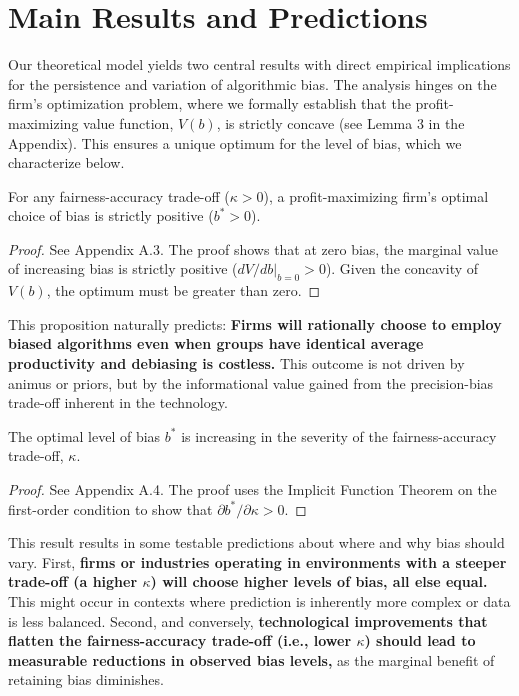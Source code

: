 \section{Main Results and Predictions}

Our theoretical model yields two central results with direct empirical implications for the persistence and variation of algorithmic bias. The analysis hinges on the firm's optimization problem, where we formally establish that the profit-maximizing value function, $V(b)$, is strictly concave (see Lemma 3 in the Appendix). This ensures a unique optimum for the level of bias, which we characterize below.

\begin{proposition}
\label{prop:existence}
For any fairness-accuracy trade-off ($\kappa > 0$), a profit-maximizing firm's optimal choice of bias is strictly positive ($b^* > 0$).
\end{proposition}
\begin{proof}
See Appendix A.3. The proof shows that at zero bias, the marginal value of increasing bias is strictly positive ($dV/db|_{b=0} > 0$). Given the concavity of $V(b)$, the optimum must be greater than zero.
\end{proof}

This proposition naturally predicts: \textbf{Firms will rationally choose to employ biased algorithms even when groups have identical average productivity and debiasing is costless.} This outcome is not driven by animus or priors, but by the informational value gained from the precision-bias trade-off inherent in the technology.

\begin{proposition}
\label{prop:comparative_static}
The optimal level of bias $b^*$ is increasing in the severity of the fairness-accuracy trade-off, $\kappa$.
\end{proposition}
\begin{proof}
See Appendix A.4. The proof uses the Implicit Function Theorem on the first-order condition to show that $\partial b^*/\partial\kappa > 0$.
\end{proof}

This result results in some testable predictions about where and why bias should vary. 
First, \textbf{firms or industries operating in environments with a steeper trade-off (a higher $\kappa$) will choose higher levels of bias, all else equal.} This might occur in contexts where prediction is inherently more complex or data is less balanced.
Second, and conversely, \textbf{technological improvements that flatten the fairness-accuracy trade-off (i.e., lower $\kappa$) should lead to measurable reductions in observed bias levels,} as the marginal benefit of retaining bias diminishes.

